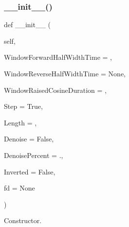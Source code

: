 \subsubsection{\texorpdfstring{\+\_\+\+\_\+init\+\_\+\+\_\+()}{\_\_init\_\_()}}
{\footnotesize\ttfamily def \+\_\+\+\_\+init\+\_\+\+\_\+ (\begin{DoxyParamCaption}\item[{}]{self,  }\item[{}]{Window\+Forward\+Half\+Width\+Time = {},  }\item[{}]{Window\+Reverse\+Half\+Width\+Time = {\ttfamily None},  }\item[{}]{Window\+Raised\+Cosine\+Duration = {},  }\item[{}]{Step = {\ttfamily True},  }\item[{}]{Length = {},  }\item[{}]{Denoise = {\ttfamily False},  }\item[{}]{Denoise\+Percent = {.},  }\item[{}]{Inverted = {\ttfamily False},  }\item[{}]{fd = {\ttfamily None} }\end{DoxyParamCaption})}



Constructor. 


